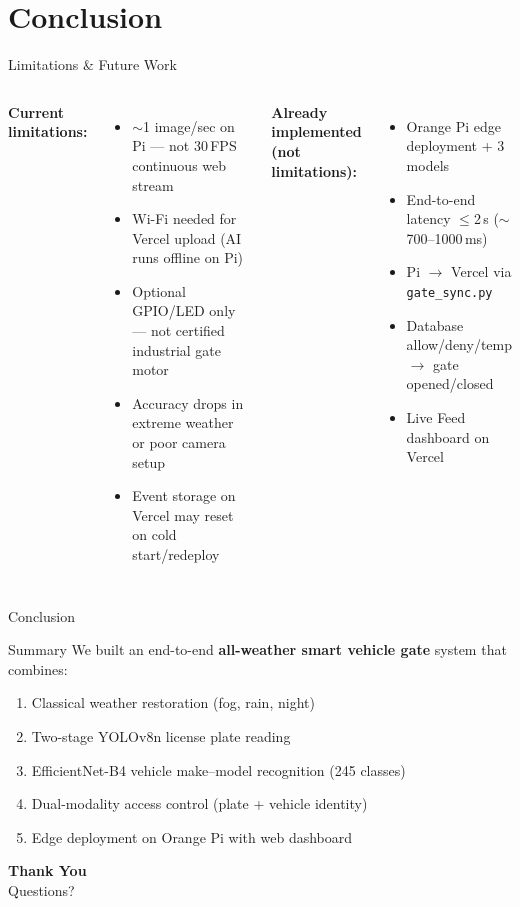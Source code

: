 \documentclass[aspectratio=169,11pt]{beamer}
\begin{document}
\section{Conclusion}

\begin{frame}{Limitations \& Future Work}
  \begin{columns}[T]
    \textbf{Current limitations:}
    \begin{itemize}
      \item $\sim$1 image/sec on Pi --- not 30\,FPS continuous web stream
      \item Wi-Fi needed for Vercel upload (AI runs offline on Pi)
      \item Optional GPIO/LED only --- not certified industrial gate motor
      \item Accuracy drops in extreme weather or poor camera setup
      \item Event storage on Vercel may reset on cold start/redeploy
    \end{itemize}
    \textbf{Already implemented (not limitations):}
    \begin{itemize}
      \item Orange Pi edge deployment + 3 models
      \item End-to-end latency $\leq$2\,s ($\sim$700--1000\,ms)
      \item Pi $\rightarrow$ Vercel via \texttt{gate\_sync.py}
      \item Database allow/deny/temp $\rightarrow$ gate opened/closed
      \item Live Feed dashboard on Vercel
    \end{itemize}
  \end{columns}
\end{frame}

\begin{frame}{Conclusion}
  \begin{block}{Summary}
    We built an end-to-end \textbf{all-weather smart vehicle gate} system that combines:
    \begin{enumerate}
      \item Classical weather restoration (fog, rain, night)
      \item Two-stage YOLOv8n license plate reading
      \item EfficientNet-B4 vehicle make--model recognition (245 classes)
      \item Dual-modality access control (plate + vehicle identity)
      \item Edge deployment on Orange Pi with web dashboard
    \end{enumerate}
  \end{block}
  \vspace{0.5em}
  \centering
  \Large\textbf{Thank You}\\[0.4em]
  \normalsize Questions?
\end{frame}
\end{document}
